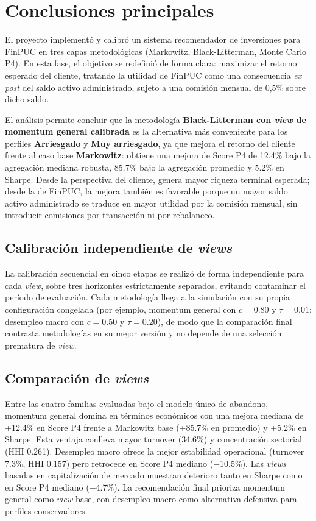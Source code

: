 \section{Conclusiones principales}

El proyecto implement\'o y calibr\'o un sistema recomendador de inversiones para
FinPUC en tres capas metodol\'ogicas (Markowitz, Black-Litterman, Monte Carlo
P4). En esta fase, el objetivo se redefini\'o de forma clara: maximizar el
retorno esperado del cliente, tratando la utilidad de FinPUC como una
consecuencia \emph{ex post} del saldo activo administrado, sujeto a una
comisi\'on mensual de 0,5\% sobre dicho saldo.

El an\'alisis permite concluir que la metodolog\'ia \textbf{Black-Litterman con
\textit{view} de momentum general calibrada} es la alternativa m\'as conveniente
para los perfiles \textbf{Arriesgado} y \textbf{Muy arriesgado}, ya que mejora
el retorno del cliente frente al caso base \textbf{Markowitz}: obtiene una
mejora de Score P4 de 12.4\% bajo la agregaci\'on mediana robusta, 85.7\% bajo
la agregaci\'on promedio y 5.2\% en Sharpe. Desde la perspectiva del cliente,
genera mayor riqueza terminal esperada; desde la de FinPUC, la mejora tambi\'en
es favorable porque un mayor saldo activo administrado se traduce en mayor
utilidad por la comisi\'on mensual, sin introducir comisiones por transacci\'on ni
por rebalanceo.

\subsection{Calibraci\'on independiente de \textit{views}}

La calibraci\'on secuencial en cinco etapas se realiz\'o de forma independiente
para cada \textit{view}, sobre tres horizontes estrictamente separados, evitando
contaminar el per\'iodo de evaluaci\'on. Cada metodolog\'ia llega a la
simulaci\'on con su propia configuraci\'on congelada (por ejemplo, momentum
general con $c=0.80$ y $\tau=0.01$; desempleo macro con $c=0.50$ y $\tau=0.20$),
de modo que la comparaci\'on final contrasta metodolog\'ias en su mejor versi\'on
y no depende de una selecci\'on prematura de \textit{view}.

\subsection{Comparaci\'on de \textit{views}}

Entre las cuatro familias evaluadas bajo el modelo \'unico de abandono, momentum
general domina en t\'erminos econ\'omicos con una mejora mediana de +12.4\% en
Score P4 frente a Markowitz base (+85.7\% en promedio) y +5.2\% en Sharpe. Esta
ventaja conlleva mayor turnover (34.6\%) y concentraci\'on sectorial (HHI
0.261). Desempleo macro ofrece la mejor estabilidad operacional (turnover
7.3\%, HHI 0.157) pero retrocede en Score P4 mediano ($-$10.5\%). Las
\textit{views} basadas en capitalizaci\'on de mercado muestran deterioro tanto
en Sharpe como en Score P4 mediano ($-$4.7\%). La recomendaci\'on final prioriza
momentum general como \textit{view} base, con desempleo macro como alternativa
defensiva para perfiles conservadores.

